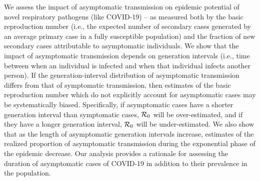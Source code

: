 {\footnotesize We assess the impact of asymptomatic transmission on epidemic potential of novel respiratory pathogens (like COVID-19) --
as measured both by the basic reproduction number (i.e., the expected number of secondary cases generated by an average primary case in a fully susceptible population) and the fraction of new secondary cases attributable to asymptomatic individuals. 
We show that the impact of asymptomatic transmission depends on generation intervals (i.e., time between when an individual is infected and when that individual infects another person).
If the generation-interval distribution of asymptomatic transmission differs from that of symptomatic transmission, then estimates of the basic reproduction number which do not explicitly account for asymptomatic cases may be systematically biased. 
Specifically, if asymptomatic cases have a shorter generation interval than symptomatic cases, ${\cal{R}}_0$ will be over-estimated, and if they have a longer generation interval, ${\cal{R}}_0$ will be under-estimated.
We also show that as the length of asymptomatic generation intervals increase, estimates of the realized proportion of asymptomatic transmission during the exponential phase of the epidemic decrease.
Our analysis provides a rationale for assessing the duration of asymptomatic cases of COVID-19 in addition to their prevalence in the population.
}
